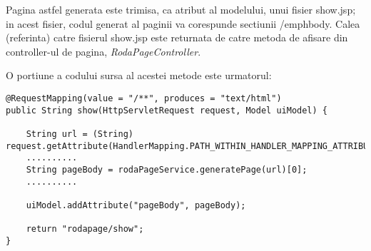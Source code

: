 \bigskip

Pagina astfel generata este trimisa, ca atribut al modelului, unui fisier show.jsp; 
in acest fisier, codul generat al paginii va corespunde sectiunii /emph{body}.
Calea (referinta) catre fisierul show.jsp este returnata de catre metoda de afisare din controller-ul de pagina, \emph{RodaPageController}.

O portiune a codului sursa al acestei metode este urmatorul:

\begin{lstlisting}[breaklines=true]
@RequestMapping(value = "/**", produces = "text/html")
public String show(HttpServletRequest request, Model uiModel) {

	String url = (String) request.getAttribute(HandlerMapping.PATH_WITHIN_HANDLER_MAPPING_ATTRIBUTE);
	..........
	String pageBody = rodaPageService.generatePage(url)[0];
	..........

	uiModel.addAttribute("pageBody", pageBody);

	return "rodapage/show";
}
\end{lstlisting}	
